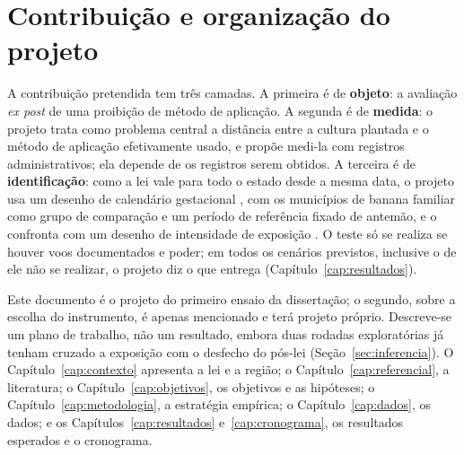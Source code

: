 \section{Contribuição e organização do projeto}

A contribuição pretendida tem três camadas. A primeira é de \textbf{objeto}: a
avaliação \emph{ex post} de uma proibição de método de aplicação. A segunda é
de \textbf{medida}: o projeto trata como problema central a distância entre a
cultura plantada e o método de aplicação efetivamente usado, e propõe medi-la
com registros administrativos; ela depende de os registros serem obtidos. A
terceira é de \textbf{identificação}: como a lei vale para todo o estado desde
a mesma data, o projeto usa um desenho de calendário gestacional
\cite{calzada2023bananas,brainerd2014seasonal}, com os municípios de banana
familiar como grupo de comparação e um período de referência fixado de
antemão, e o confronta com um desenho de intensidade de exposição
\cite{callaway2024continuous}. O teste só se realiza se houver voos
documentados e poder; em todos os cenários previstos, inclusive o de ele não
se realizar, o projeto diz o que entrega (Capítulo~\ref{cap:resultados}).

Este documento é o projeto do primeiro ensaio da dissertação; o segundo, sobre
a escolha do instrumento, é apenas mencionado e terá projeto próprio.
Descreve-se um plano de trabalho, não um resultado, embora duas rodadas
exploratórias já tenham cruzado a exposição com o desfecho do pós-lei
(Seção~\ref{sec:inferencia}). O Capítulo~\ref{cap:contexto} apresenta a lei e
a região; o Capítulo~\ref{cap:referencial}, a literatura; o
Capítulo~\ref{cap:objetivos}, os objetivos e as hipóteses; o
Capítulo~\ref{cap:metodologia}, a estratégia empírica; o
Capítulo~\ref{cap:dados}, os dados; e os
Capítulos~\ref{cap:resultados} e~\ref{cap:cronograma}, os resultados esperados
e o cronograma.
